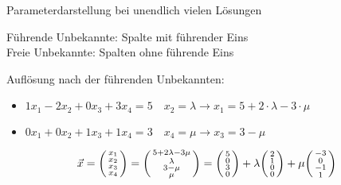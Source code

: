     \begin{KR}{Parameterdarstellung} bei unendlich vielen Lösungen

        \begin{minipage}{0.74\linewidth}
            Führende Unbekannte: Spalte mit führender Eins\\
            Freie Unbekannte: Spalten ohne führende Eins
        \end{minipage}
        \begin{minipage}{0.25\linewidth}
        \end{minipage}

        \vspace{1mm}
        
        Auflösung nach der führenden Unbekannten:
        \begin{itemize}
            \item $1 x_1 - 2 x_2 + 0 x_3 + 3 x_4 = 5 \quad x_2 = \lambda \rightarrow x_1 = 5 + 2 \cdot \lambda - 3 \cdot \mu$
            \item $0 x_1 + 0 x_2 + 1 x_3 + 1 x_4 = 3 \quad x_4 = \mu \rightarrow x_3 = 3 - \mu$    
        \end{itemize}
        \vspace*{2mm}
        $$ \vec{x} = \begin{psmallmatrix} x_1 \\ x_2 \\ x_3 \\ x_4 \end{psmallmatrix} 
        = \begin{psmallmatrix} 5 + 2 \lambda - 3 \mu \\ \lambda \\ 3 - \mu \\ \mu \end{psmallmatrix} 
        = \begin{psmallmatrix} 5 \\ 0 \\ 3 \\ 0 \end{psmallmatrix} + \lambda \begin{psmallmatrix} 2 \\ 1 \\ 0 \\ 0 \end{psmallmatrix} + \mu \begin{psmallmatrix} -3 \\ 0 \\ -1 \\ 1 \end{psmallmatrix}$$
    \end{KR}

